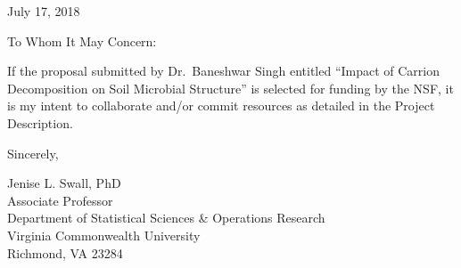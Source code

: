 \documentclass[12pt]{article}
\begin{document}
\pagestyle{empty}

\vspace*{0.5in}

\noindent July 17, 2018

\vspace*{1.5in}




\noindent To Whom It May Concern:

\vspace{0.2in}

\noindent If the proposal submitted by Dr.\ Baneshwar Singh entitled
``Impact of Carrion Decomposition on Soil Microbial Structure'' is
selected for funding by the NSF, it is my intent to collaborate and/or
commit resources as detailed in the Project Description.

\vspace*{0.3in}

\noindent Sincerely,

\vspace*{0.5in}

\noindent Jenise L. Swall, PhD\\
\noindent Associate Professor\\
\noindent Department of Statistical Sciences \& Operations Research\\
\noindent Virginia Commonwealth University\\
\noindent Richmond, VA 23284
\end{document}
